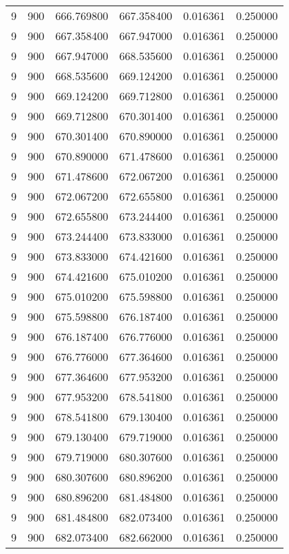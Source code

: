 \begin{longtable}{rrrrrr}
9 & 900 & 666.769800 & 667.358400 & 0.016361 & 0.250000 \\
9 & 900 & 667.358400 & 667.947000 & 0.016361 & 0.250000 \\
9 & 900 & 667.947000 & 668.535600 & 0.016361 & 0.250000 \\
9 & 900 & 668.535600 & 669.124200 & 0.016361 & 0.250000 \\
9 & 900 & 669.124200 & 669.712800 & 0.016361 & 0.250000 \\
9 & 900 & 669.712800 & 670.301400 & 0.016361 & 0.250000 \\
9 & 900 & 670.301400 & 670.890000 & 0.016361 & 0.250000 \\
9 & 900 & 670.890000 & 671.478600 & 0.016361 & 0.250000 \\
9 & 900 & 671.478600 & 672.067200 & 0.016361 & 0.250000 \\
9 & 900 & 672.067200 & 672.655800 & 0.016361 & 0.250000 \\
9 & 900 & 672.655800 & 673.244400 & 0.016361 & 0.250000 \\
9 & 900 & 673.244400 & 673.833000 & 0.016361 & 0.250000 \\
9 & 900 & 673.833000 & 674.421600 & 0.016361 & 0.250000 \\
9 & 900 & 674.421600 & 675.010200 & 0.016361 & 0.250000 \\
9 & 900 & 675.010200 & 675.598800 & 0.016361 & 0.250000 \\
9 & 900 & 675.598800 & 676.187400 & 0.016361 & 0.250000 \\
9 & 900 & 676.187400 & 676.776000 & 0.016361 & 0.250000 \\
9 & 900 & 676.776000 & 677.364600 & 0.016361 & 0.250000 \\
9 & 900 & 677.364600 & 677.953200 & 0.016361 & 0.250000 \\
9 & 900 & 677.953200 & 678.541800 & 0.016361 & 0.250000 \\
9 & 900 & 678.541800 & 679.130400 & 0.016361 & 0.250000 \\
9 & 900 & 679.130400 & 679.719000 & 0.016361 & 0.250000 \\
9 & 900 & 679.719000 & 680.307600 & 0.016361 & 0.250000 \\
9 & 900 & 680.307600 & 680.896200 & 0.016361 & 0.250000 \\
9 & 900 & 680.896200 & 681.484800 & 0.016361 & 0.250000 \\
9 & 900 & 681.484800 & 682.073400 & 0.016361 & 0.250000 \\
9 & 900 & 682.073400 & 682.662000 & 0.016361 & 0.250000 \\

\end{longtable}
